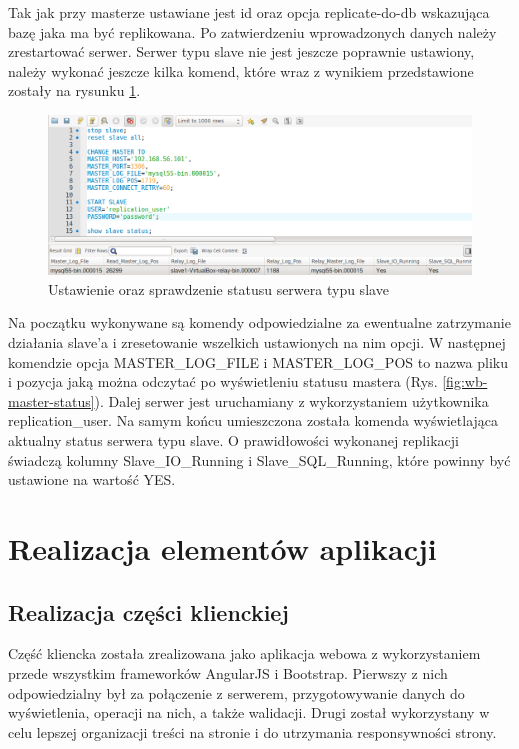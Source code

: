 \documentclass{mgr}
\begin{document}
Tak jak przy masterze ustawiane jest id oraz opcja replicate-do-db wskazująca bazę jaka ma być replikowana. Po zatwierdzeniu wprowadzonych danych należy zrestartować serwer. Serwer typu slave nie jest jeszcze poprawnie ustawiony, należy wykonać jeszcze kilka komend, które wraz z wynikiem przedstawione zostały na rysunku \ref{fig:wb-slave-status-cmd}.

\begin{figure}[!ht]
	\centering
	\includegraphics[width=\textwidth]{images/wb_slave_status_cmd.png}
	\caption{Ustawienie oraz sprawdzenie statusu serwera typu slave}
	\label{fig:wb-slave-status-cmd}
\end{figure}

Na początku wykonywane są komendy odpowiedzialne za ewentualne zatrzymanie działania slave'a i zresetowanie wszelkich ustawionych na nim opcji. W następnej komendzie opcja MASTER\_LOG\_FILE i MASTER\_LOG\_POS to nazwa pliku i pozycja jaką można odczytać po wyświetleniu statusu mastera (Rys. \ref{fig:wb-master-status}). Dalej serwer jest uruchamiany z wykorzystaniem użytkownika replication\_user. Na samym końcu umieszczona została komenda wyświetlająca aktualny status serwera typu slave. O prawidłowości wykonanej replikacji świadczą kolumny Slave\_IO\_Running i Slave\_SQL\_Running, które powinny być ustawione na wartość YES.

\section{Realizacja elementów aplikacji}

\subsection{Realizacja części klienckiej}
Część kliencka została zrealizowana jako aplikacja webowa z wykorzystaniem przede wszystkim frameworków AngularJS i Bootstrap. Pierwszy z nich odpowiedzialny był za połączenie z serwerem, przygotowywanie danych do wyświetlenia, operacji na nich, a także walidacji. Drugi został wykorzystany w celu lepszej organizacji treści na stronie i do utrzymania responsywności strony.
\end{document}
